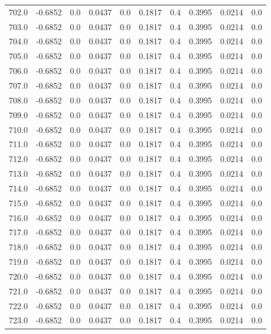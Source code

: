 \begin{longtable}{lrrrrrrrrr}
702.0 & -0.6852 & 0.0 & 0.0437 & 0.0 & 0.1817 & 0.4 & 0.3995 & 0.0214 & 0.0 \\
703.0 & -0.6852 & 0.0 & 0.0437 & 0.0 & 0.1817 & 0.4 & 0.3995 & 0.0214 & 0.0 \\
704.0 & -0.6852 & 0.0 & 0.0437 & 0.0 & 0.1817 & 0.4 & 0.3995 & 0.0214 & 0.0 \\
705.0 & -0.6852 & 0.0 & 0.0437 & 0.0 & 0.1817 & 0.4 & 0.3995 & 0.0214 & 0.0 \\
706.0 & -0.6852 & 0.0 & 0.0437 & 0.0 & 0.1817 & 0.4 & 0.3995 & 0.0214 & 0.0 \\
707.0 & -0.6852 & 0.0 & 0.0437 & 0.0 & 0.1817 & 0.4 & 0.3995 & 0.0214 & 0.0 \\
708.0 & -0.6852 & 0.0 & 0.0437 & 0.0 & 0.1817 & 0.4 & 0.3995 & 0.0214 & 0.0 \\
709.0 & -0.6852 & 0.0 & 0.0437 & 0.0 & 0.1817 & 0.4 & 0.3995 & 0.0214 & 0.0 \\
710.0 & -0.6852 & 0.0 & 0.0437 & 0.0 & 0.1817 & 0.4 & 0.3995 & 0.0214 & 0.0 \\
711.0 & -0.6852 & 0.0 & 0.0437 & 0.0 & 0.1817 & 0.4 & 0.3995 & 0.0214 & 0.0 \\
712.0 & -0.6852 & 0.0 & 0.0437 & 0.0 & 0.1817 & 0.4 & 0.3995 & 0.0214 & 0.0 \\
713.0 & -0.6852 & 0.0 & 0.0437 & 0.0 & 0.1817 & 0.4 & 0.3995 & 0.0214 & 0.0 \\
714.0 & -0.6852 & 0.0 & 0.0437 & 0.0 & 0.1817 & 0.4 & 0.3995 & 0.0214 & 0.0 \\
715.0 & -0.6852 & 0.0 & 0.0437 & 0.0 & 0.1817 & 0.4 & 0.3995 & 0.0214 & 0.0 \\
716.0 & -0.6852 & 0.0 & 0.0437 & 0.0 & 0.1817 & 0.4 & 0.3995 & 0.0214 & 0.0 \\
717.0 & -0.6852 & 0.0 & 0.0437 & 0.0 & 0.1817 & 0.4 & 0.3995 & 0.0214 & 0.0 \\
718.0 & -0.6852 & 0.0 & 0.0437 & 0.0 & 0.1817 & 0.4 & 0.3995 & 0.0214 & 0.0 \\
719.0 & -0.6852 & 0.0 & 0.0437 & 0.0 & 0.1817 & 0.4 & 0.3995 & 0.0214 & 0.0 \\
720.0 & -0.6852 & 0.0 & 0.0437 & 0.0 & 0.1817 & 0.4 & 0.3995 & 0.0214 & 0.0 \\
721.0 & -0.6852 & 0.0 & 0.0437 & 0.0 & 0.1817 & 0.4 & 0.3995 & 0.0214 & 0.0 \\
722.0 & -0.6852 & 0.0 & 0.0437 & 0.0 & 0.1817 & 0.4 & 0.3995 & 0.0214 & 0.0 \\
723.0 & -0.6852 & 0.0 & 0.0437 & 0.0 & 0.1817 & 0.4 & 0.3995 & 0.0214 & 0.0 \\

\end{longtable}
